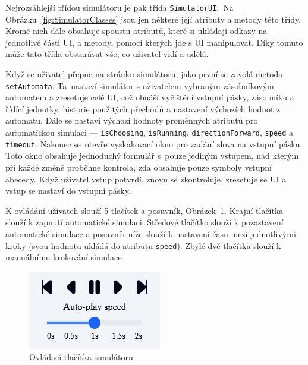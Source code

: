 Nejrozsáhlejší třídou simulátoru je pak třída \texttt{SimulatorUI}.\ Na Obrázku~\ref{fig:SimulatorClasses} jsou jen některé její atributy a metody této třídy. Kromě nich dále obsahuje spoustu atributů, které si ukládají odkazy na jednotlivé části UI, a metody, pomocí kterých jde s UI manipulovat. Díky tomuto může tato třída obstarávat vše, co uživatel vidí a udělá.

Když se uživatel přepne na stránku simulátoru, jako první se zavolá metoda \texttt{setAutomata}. Ta~nastaví simulátor s uživatelem vybraným zásobníkovým automatem a zresetuje celé UI, což obnáší vyčištění vstupní pásky, zásobníku a řídící jednotky, historie použitých přechodů a nastavení výchozích hodnot z automatu. Dále se nastaví výchozí hodnoty proměnných atributů pro automatickou simulaci --- \texttt{isChoosing}, \texttt{isRunning}, \texttt{directionForward}, \texttt{speed} a \texttt{timeout}. Nakonec se~otevře vyskakovací okno pro zadání slova na vstupní pásku. Toto okno obsahuje jednoduchý formulář s~pouze jediným vstupem, nad kterým při každé změně proběhne kontrola, zda obsahuje pouze symboly vstupní abecedy. Když uživatel vstup potvrdí, znovu se zkontroluje, zresetuje se UI a vstup se nastaví do vstupní pásky.

K ovládání uživateli slouží 5 tlačítek a posuvník, Obrázek~\ref{fig:SimulatorButtons}. Krajní tlačítka slouží k zapnutí automatické simulaci. Středové tlačítko slouží k pozastavení automatické simulace a posuvník níže slouží k nastavení času mezi jednotlivými kroky (svou hodnotu ukládá do atributu \texttt{speed}). Zbylé dvě tlačítka slouží k manuálnímu krokování simulace.

\begin{figure}[h]
    \centering
    \includegraphics{Figures/PrntScrn_SimulatorButtons.png}
    \caption{Ovládací tlačítka simulátoru}\label{fig:SimulatorButtons}
\end{figure}

